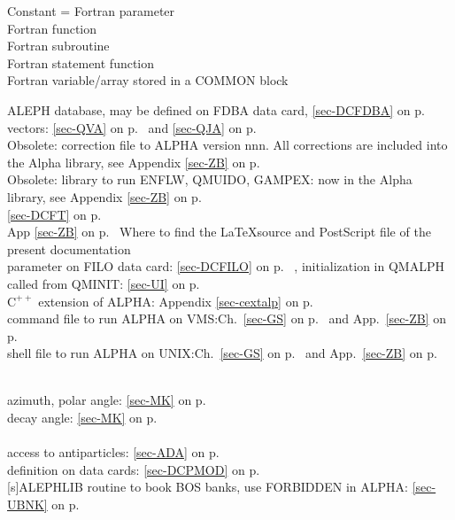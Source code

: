 \setlength{\parindent}{0pt}
\begin{theindex}
\end{theindex}
 \myitem{\bf [c]}Constant = Fortran parameter\\
 \myitem{\bf [f]}Fortran function\\
 \myitem{\bf [s]}Fortran subroutine\\
 \myitem{\bf [sf]}Fortran statement function\\
 \myitem{\bf [v]}Fortran variable/array stored in a COMMON block
 
  ALEPH database, may be defined on FDBA data card, \ref{sec-DCFDBA} on p.~\pageref{sec-DCFDBA}\\
 vectors: \ref{sec-QVA} on
 p.~\pageref{sec-QVA} and \ref{sec-QJA} on p.~\pageref{sec-QJA}\\
  Obsolete: correction file to ALPHA version nnn.
 All corrections are included into the Alpha library, see
 Appendix \ref{sec-ZB} on p.~\pageref{sec-ZB}\\
 Obsolete: library to run ENFLW, QMUIDO, GAMPEX:
 now  in the Alpha library, see
 Appendix \ref{sec-ZB} on p.~\pageref{sec-ZB}\\
 \ref{sec-DCFT} on p.~\pageref{sec-DCFT}\\
  App \ref{sec-ZB} on p.~\pageref{sec-ZB}  Where to find the \LaTeX source
  and PostScript file of the present documentation\\
 parameter on FILO data card: \ref{sec-DCFILO} on
 p.~\pageref{sec-DCFILO}
 , initialization in QMALPH called from QMINIT:
 \ref{sec-UI} on p.~\pageref{sec-UI}\\
  $\mathrm{C^{++}}$ extension of ALPHA: Appendix \ref{sec-cextalp} on p.~\pageref{sec-cextalp}\\
 command file to run ALPHA on VMS:Ch.~\ref{sec-GS} on p.~\pageref{sec-GS}
 and App.~\ref{sec-ZB} on p.~\pageref{sec-ZB}\\
 shell file to run ALPHA on UNIX:Ch.~\ref{sec-GS} on p.~\pageref{sec-GS}
 and App.~\ref{sec-ZB} on p.~\pageref{sec-alphar}
 
 \\
 \mysubitem azimuth, polar angle: \ref{sec-MK} on p.~\pageref{sec-MK}\\
 \mysubitem decay angle: \ref{sec-MK} on p.~\pageref{sec-MK}\\
 \\
 \mysubitem access to antiparticles: \ref{sec-ADA} on p.~\pageref{sec-ADA}\\
 \mysubitem definition on data cards: \ref{sec-DCPMOD} on p.~\pageref{sec-DCPMOD}\\
 [s]ALEPHLIB routine to book BOS banks, use FORBIDDEN in ALPHA:
 \ref{sec-UBNK} on p.~\pageref{sec-UBNK}
 
